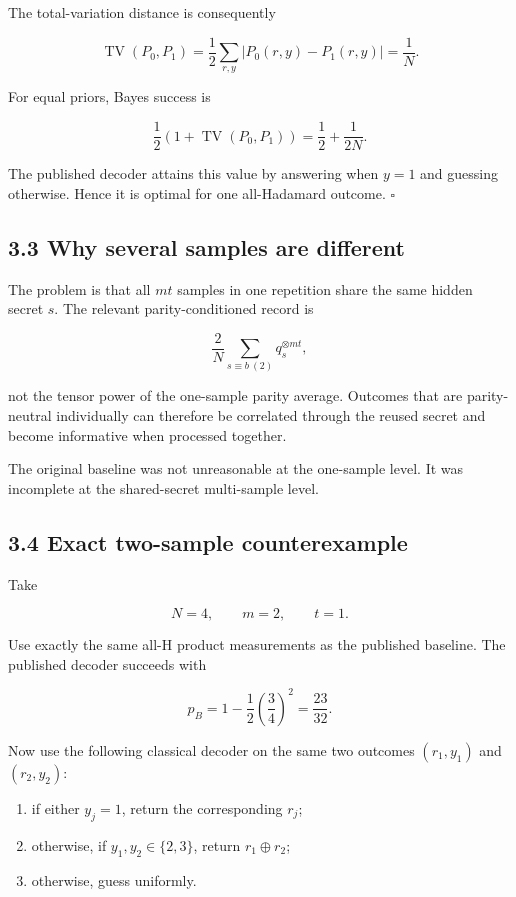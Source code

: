 \documentclass[
  10pt,
]{article}
\providecommand{\tightlist}{%
  \setlength{\itemsep}{0pt}\setlength{\parskip}{0pt}}
\begin{document}
The total-variation distance is consequently

\[
\operatorname{TV}(P_0,P_1)
=
\frac12\sum_{r,y}|P_0(r,y)-P_1(r,y)|
=
\frac1N.
\]

For equal priors, Bayes success is

\[
\frac12\left(1+\operatorname{TV}(P_0,P_1)\right)
=
\frac12+\frac1{2N}.
\]

The published decoder attains this value by answering when \(y=1\) and
guessing otherwise. Hence it is optimal for one all-Hadamard outcome.
\(\square\)

\subsection{3.3 Why several samples are
different}\label{why-several-samples-are-different}

The problem is that all \(mt\) samples in one repetition share the same
hidden secret \(s\). The relevant parity-conditioned record is

\[
\frac2N
\sum_{s\equiv b\ (2)}
q_s^{\otimes mt},
\]

not the tensor power of the one-sample parity average. Outcomes that are
parity-neutral individually can therefore be correlated through the
reused secret and become informative when processed together.

The original baseline was not unreasonable at the one-sample level. It
was incomplete at the shared-secret multi-sample level.

\subsection{3.4 Exact two-sample
counterexample}\label{exact-two-sample-counterexample}

Take

\[
N=4,
\qquad
m=2,
\qquad
t=1.
\]

Use exactly the same all-H product measurements as the published
baseline. The published decoder succeeds with

\[
p_B
=
1-\frac12\left(\frac34\right)^2
=
\frac{23}{32}.
\]

Now use the following classical decoder on the same two outcomes
\((r_1,y_1)\) and \((r_2,y_2)\):

\begin{enumerate}
\def\labelenumi{\arabic{enumi}.}
\tightlist
\item
  if either \(y_j=1\), return the corresponding \(r_j\);
\item
  otherwise, if \(y_1,y_2\in\{2,3\}\), return \(r_1\oplus r_2\);
\item
  otherwise, guess uniformly.
\end{enumerate}
\end{document}
